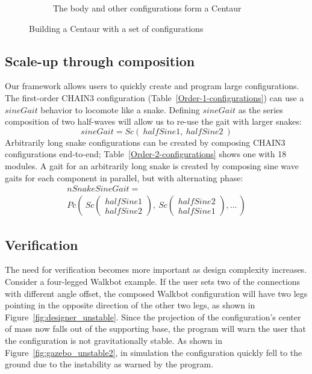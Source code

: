 \documentclass[graybox]{svmult}
\begin{document}
\begin{figure}
\begin{center}
\begin{subfigure}[b]{0.65\columnwidth}
                \caption{The body and other configurations form a Centaur}
                \label{fig:walkbot2}
        \end{subfigure}
\end{center}
\caption{Building a Centaur with a set of configurations}
\label{fig:walkbot}
\end{figure}

\subsection{Scale-up through composition}
Our framework allows users to quickly create and program large configurations. The
first-order CHAIN3 configuration (Table~\ref{Order-1-configurations}) can use a \(sineGait\)
behavior to locomote like a snake. Defining \(sineGait\)  as the series composition
of two half-waves will allow us to re-use the gait with larger snakes:
\begin{displaymath}
sineGait = Sc(~halfSine1,~halfSine2~)
\end{displaymath}
Arbitrarily long snake configurations can be created
by composing CHAIN3 configurations end-to-end; Table~\ref{Order-2-configurations} shows one with 18 modules.
A gait for an arbitrarily long snake is created by composing sine wave
gaits for each component in parallel, but with alternating phase:
\begin{align*}
nSnakeSineGait = ~~~~~~~~~~~~~~~~~~~~~~~~~~~~~~~~~~~~~~~~~~\\
Pc \left(~Sc\begin{pmatrix} halfSine1 \\ halfSine2 \end{pmatrix},
~Sc\begin{pmatrix} halfSine2 \\ halfSine1 \end{pmatrix},\ldots ~\right)
\end{align*}


\subsection{Verification}
The need for verification becomes more important as design complexity increases. Consider a four-legged Walkbot example. If the user sets two of the connections with different angle offset, the composed Walkbot configuration will have two legs pointing in the opposite direction of the other two legs, as shown in Figure~\ref{fig:designer_unstable}. Since the projection of the configuration's center of mass now falls out of the supporting base, the program will warn the user that the configuration is not gravitationally stable. As shown in Figure~\ref{fig:gazebo_unstable2}, in simulation the configuration quickly fell to the ground due to the instability as warned by the program. 
\end{document}
